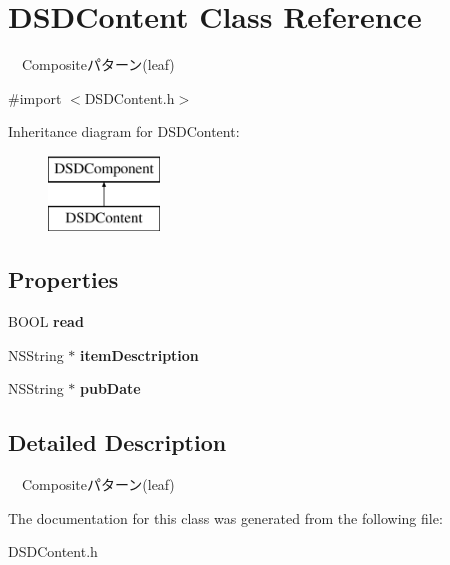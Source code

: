 \hypertarget{interface_d_s_d_content}{\section{D\-S\-D\-Content Class Reference}
\label{interface_d_s_d_content}
}


　\-Compositeパターン(leaf)  




{\ttfamily \#import $<$D\-S\-D\-Content.\-h$>$}

Inheritance diagram for D\-S\-D\-Content\-:\begin{figure}[H]
\begin{center}
\leavevmode
\includegraphics[height=2.000000cm]{interface_d_s_d_content}
\end{center}
\end{figure}
\subsection*{Properties}
\begin{DoxyCompactItemize}
\item 
\hypertarget{interface_d_s_d_content_ad25262cea3c9758197ed7e8167a73b7b}{B\-O\-O\-L {\bfseries read}}\label{interface_d_s_d_content_ad25262cea3c9758197ed7e8167a73b7b}

\item 
\hypertarget{interface_d_s_d_content_a336544a63829b79c6ed16f8b9e684d81}{N\-S\-String $\ast$ {\bfseries item\-Desctription}}\label{interface_d_s_d_content_a336544a63829b79c6ed16f8b9e684d81}

\item 
\hypertarget{interface_d_s_d_content_a9ec910cfb88189d6b4d673108ad7c0de}{N\-S\-String $\ast$ {\bfseries pub\-Date}}\label{interface_d_s_d_content_a9ec910cfb88189d6b4d673108ad7c0de}

\end{DoxyCompactItemize}


\subsection{Detailed Description}
　\-Compositeパターン(leaf) 

The documentation for this class was generated from the following file\-:\begin{DoxyCompactItemize}
\item 
D\-S\-D\-Content.\-h\end{DoxyCompactItemize}
